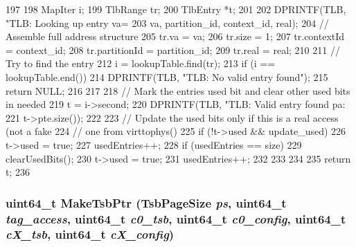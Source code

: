 \begin{DoxyCode}
197 {
198     MapIter i;
199     TlbRange tr;
200     TlbEntry *t;
201 
202     DPRINTF(TLB, "TLB: Looking up entry va=%
203             va, partition_id, context_id, real);
204     // Assemble full address structure
205     tr.va = va;
206     tr.size = 1;
207     tr.contextId = context_id;
208     tr.partitionId = partition_id;
209     tr.real = real;
210 
211     // Try to find the entry
212     i = lookupTable.find(tr);
213     if (i == lookupTable.end()) {
214         DPRINTF(TLB, "TLB: No valid entry found\n");
215         return NULL;
216     }
217 
218     // Mark the entries used bit and clear other used bits in needed
219     t = i->second;
220     DPRINTF(TLB, "TLB: Valid entry found pa: %
221             t->pte.size());
222 
223     // Update the used bits only if this is a real access (not a fake
224     // one from virttophys()
225     if (!t->used && update_used) {
226         t->used = true;
227         usedEntries++;
228         if (usedEntries == size) {
229             clearUsedBits();
230             t->used = true;
231             usedEntries++;
232         }
233     }
234 
235     return t;
236 }
\end{DoxyCode}
\hypertarget{classSparcISA_1_1TLB_a69c520e9f2bec8ddb4eb5121cf10a94c}{
\subsubsection[{MakeTsbPtr}]{\setlength{\rightskip}{0pt plus 5cm}uint64\_\-t MakeTsbPtr ({\bf TsbPageSize} {\em ps}, \/  uint64\_\-t {\em tag\_\-access}, \/  uint64\_\-t {\em c0\_\-tsb}, \/  uint64\_\-t {\em c0\_\-config}, \/  uint64\_\-t {\em cX\_\-tsb}, \/  uint64\_\-t {\em cX\_\-config})}}
\label{classSparcISA_1_1TLB_a69c520e9f2bec8ddb4eb5121cf10a94c}



